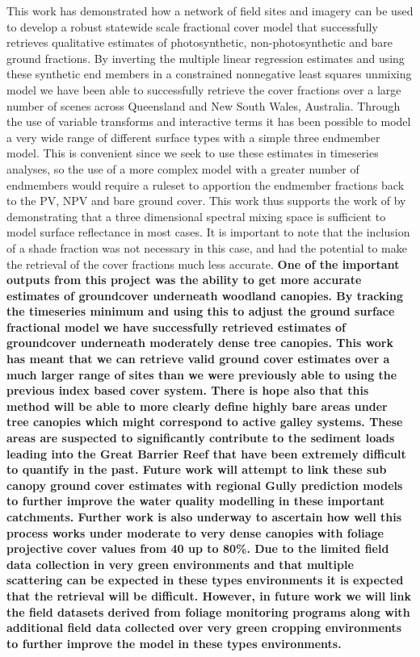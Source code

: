 \documentclass[remotesensing,article,accept,moreauthors,pdftex,12pt,a4paper]{mdpi}
\begin{document}
This work has demonstrated how a network of field sites and imagery can be used to develop a robust statewide scale fractional cover model that successfully retrieves qualitative estimates of photosynthetic, non-photosynthetic and bare ground fractions. By inverting the multiple linear regression estimates and using these synthetic end members in a constrained nonnegative least squares unmixing model we have been able to successfully retrieve the cover fractions over a large number of scenes across Queensland and New South Wales, Australia.
Through the use of variable transforms and interactive terms it has been possible to model a very wide range of different surface types with a simple three endmember model. This is convenient since we seek to use these estimates in timeseries analyses, so the use of a more complex model with a greater number of endmembers would require a ruleset to apportion the endmember fractions back to the PV, NPV and bare ground cover. This work thus supports the work of \citep{Small2004a} by demonstrating that a three dimensional spectral mixing space is sufficient to model surface reflectance in most cases. It is important to note that the inclusion of a shade fraction was not necessary in this case, and had the potential to make the retrieval of the cover fractions much less accurate.
\textbf{One of the important outputs from this project was the ability to get more accurate estimates of groundcover underneath woodland canopies. By tracking the timeseries minimum and using this to adjust the ground surface fractional model we have successfully retrieved estimates of groundcover underneath moderately dense tree canopies. This work has meant that we can retrieve valid ground cover estimates over a much larger range of sites than we were previously able to using the previous index based cover system\citep{Karfs2009}. There is hope also that this method will be able to more clearly define highly bare areas under tree canopies which might correspond to active galley systems. These areas are suspected to significantly contribute to the sediment loads leading into the Great Barrier Reef that have been extremely difficult to quantify in the past. Future work will attempt to link these sub canopy ground cover estimates with regional Gully prediction models \citep{Eustace2009} to further improve the water quality modelling in these important catchments. Further work is also underway to ascertain how well this process works under moderate to very dense canopies with foliage projective cover values from 40 up to 80\%. Due to the limited field data collection in very green environments and that multiple scattering can be expected in these types environments it is expected that the retrieval will be difficult. However, in future work we will link the field datasets derived from foliage monitoring programs along with additional field data collected over very green cropping environments to further improve the model in these types environments.}
\end{document}
